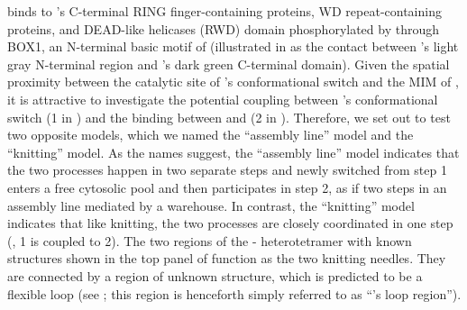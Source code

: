  binds to 's C-terminal RING finger-containing proteins, WD repeat-containing proteins, and DEAD-like helicases (RWD) domain phosphorylated by  through BOX1, an N-terminal basic motif of  \cite{Ji2017eLife, BUB1-CDC20-MAD1} (illustrated in  as the contact between 's light gray N-terminal region and 's dark green C-terminal domain). Given the spatial proximity between the catalytic site of 's conformational switch and the MIM of , it is attractive to investigate the potential coupling between 's conformational switch (\textcircled{\small{1}} in ) and the binding between  and  (\textcircled{\small{2}} in ). Therefore, we set out to test two opposite models, which we named the ``assembly line'' model and the ``knitting'' model. As the names suggest, the ``assembly line'' model indicates that the two processes happen in two separate steps and newly switched  from step \textcircled{\small{1}} enters a free cytosolic pool and then participates in step \textcircled{\small{2}}, as if two steps in an assembly line mediated by a warehouse. In contrast, the ``knitting'' model indicates that like knitting, the two processes are closely coordinated in one step  (, \textcircled{\small{1}} is coupled to \textcircled{\small{2}}). The two regions of the - heterotetramer with known structures shown in the top panel of  function as the two knitting needles. They are connected by a region of unknown structure, which is predicted to be a flexible loop (see ; this region is henceforth simply referred to as ``'s loop region'').

